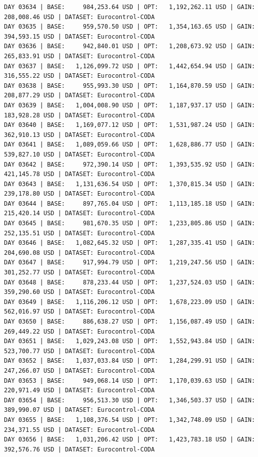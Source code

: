 \documentclass[11pt,a4paper]{article}
\begin{document}
\begin{verbatim}
DAY 03634 | BASE:     984,253.64 USD | OPT:   1,192,262.11 USD | GAIN: 208,008.46 USD | DATASET: Eurocontrol-CODA
DAY 03635 | BASE:     959,570.50 USD | OPT:   1,354,163.65 USD | GAIN: 394,593.15 USD | DATASET: Eurocontrol-CODA
DAY 03636 | BASE:     942,840.01 USD | OPT:   1,208,673.92 USD | GAIN: 265,833.91 USD | DATASET: Eurocontrol-CODA
DAY 03637 | BASE:   1,126,099.72 USD | OPT:   1,442,654.94 USD | GAIN: 316,555.22 USD | DATASET: Eurocontrol-CODA
DAY 03638 | BASE:     955,993.30 USD | OPT:   1,164,870.59 USD | GAIN: 208,877.29 USD | DATASET: Eurocontrol-CODA
DAY 03639 | BASE:   1,004,008.90 USD | OPT:   1,187,937.17 USD | GAIN: 183,928.28 USD | DATASET: Eurocontrol-CODA
DAY 03640 | BASE:   1,169,077.12 USD | OPT:   1,531,987.24 USD | GAIN: 362,910.13 USD | DATASET: Eurocontrol-CODA
DAY 03641 | BASE:   1,089,059.66 USD | OPT:   1,628,886.77 USD | GAIN: 539,827.10 USD | DATASET: Eurocontrol-CODA
DAY 03642 | BASE:     972,390.14 USD | OPT:   1,393,535.92 USD | GAIN: 421,145.78 USD | DATASET: Eurocontrol-CODA
DAY 03643 | BASE:   1,131,636.54 USD | OPT:   1,370,815.34 USD | GAIN: 239,178.80 USD | DATASET: Eurocontrol-CODA
DAY 03644 | BASE:     897,765.04 USD | OPT:   1,113,185.18 USD | GAIN: 215,420.14 USD | DATASET: Eurocontrol-CODA
DAY 03645 | BASE:     981,670.35 USD | OPT:   1,233,805.86 USD | GAIN: 252,135.51 USD | DATASET: Eurocontrol-CODA
DAY 03646 | BASE:   1,082,645.32 USD | OPT:   1,287,335.41 USD | GAIN: 204,690.08 USD | DATASET: Eurocontrol-CODA
DAY 03647 | BASE:     917,994.79 USD | OPT:   1,219,247.56 USD | GAIN: 301,252.77 USD | DATASET: Eurocontrol-CODA
DAY 03648 | BASE:     878,233.44 USD | OPT:   1,237,524.03 USD | GAIN: 359,290.60 USD | DATASET: Eurocontrol-CODA
DAY 03649 | BASE:   1,116,206.12 USD | OPT:   1,678,223.09 USD | GAIN: 562,016.97 USD | DATASET: Eurocontrol-CODA
DAY 03650 | BASE:     886,638.27 USD | OPT:   1,156,087.49 USD | GAIN: 269,449.22 USD | DATASET: Eurocontrol-CODA
DAY 03651 | BASE:   1,029,243.08 USD | OPT:   1,552,943.84 USD | GAIN: 523,700.77 USD | DATASET: Eurocontrol-CODA
DAY 03652 | BASE:   1,037,033.84 USD | OPT:   1,284,299.91 USD | GAIN: 247,266.07 USD | DATASET: Eurocontrol-CODA
DAY 03653 | BASE:     949,068.14 USD | OPT:   1,170,039.63 USD | GAIN: 220,971.49 USD | DATASET: Eurocontrol-CODA
DAY 03654 | BASE:     956,513.30 USD | OPT:   1,346,503.37 USD | GAIN: 389,990.07 USD | DATASET: Eurocontrol-CODA
DAY 03655 | BASE:   1,108,376.54 USD | OPT:   1,342,748.09 USD | GAIN: 234,371.55 USD | DATASET: Eurocontrol-CODA
DAY 03656 | BASE:   1,031,206.42 USD | OPT:   1,423,783.18 USD | GAIN: 392,576.76 USD | DATASET: Eurocontrol-CODA

\end{verbatim}
\end{document}
